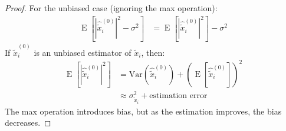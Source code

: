 \documentclass[12pt]{article}
\DeclareMathOperator{\E}{E}
\theoremstyle{definition}
\begin{document}
\begin{proof}
    For the unbiased case (ignoring the max operation):
    \begin{align}
        \E[|\hat{\tilde{x}}_i^{(0)}|^2 - \sigma^2] & = \E[|\hat{\tilde{x}}_i^{(0)}|^2] - \sigma^2
    \end{align}
    If $\hat{\tilde{x}}_i^{(0)}$ is an unbiased estimator of $\tilde{x}_i$, then:
    \begin{align}
        \E[|\hat{\tilde{x}}_i^{(0)}|^2] & = \text{Var}(\hat{\tilde{x}}_i^{(0)}) + (\E[\hat{\tilde{x}}_i^{(0)}])^2 \\
                                        & \approx \sigma_{\tilde{x}_i}^2 + \text{estimation error}
    \end{align}
    The max operation introduces bias, but as the estimation improves, the bias decreases.
\end{proof}

\newpage

\end{document}
